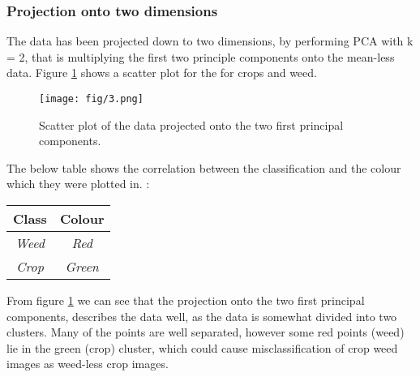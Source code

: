 \documentclass{article}
\begin{document}
\subsubsection{Projection onto two dimensions}
The data has been projected down to two dimensions, by performing PCA with k = 2, that is multiplying the first two principle components onto the mean-less data. Figure \ref{fig:scatter} shows a scatter plot for the for crops and weed.
\begin{figure}[H]
  \centering
  \texttt{[image: fig/3.png]}
  \caption{Scatter plot of the data projected onto the two first principal components.}
  \label{fig:scatter}
\end{figure}
The below table shows the correlation between the classification and the colour which they were plotted in. :
\begin{table}[H]
  \centering
  \begin{tabular}{|c|c|}
  \hline
    \textsf{Class} & \textsf{Colour}\\
    \hline
    \textsl{Weed} & \textsl{Red} \\
    \hline
    \textsl{Crop} & \textsl{Green} \\
    \hline
  \end{tabular}
\end{table}
From figure \ref{fig:scatter} we can see that the projection onto the two first principal components, describes the data well, as the data is somewhat divided into two clusters. Many of the points are well separated, however some red points (weed) lie in the green (crop) cluster, which could cause misclassification of crop weed images as weed-less crop images.
\end{document}
